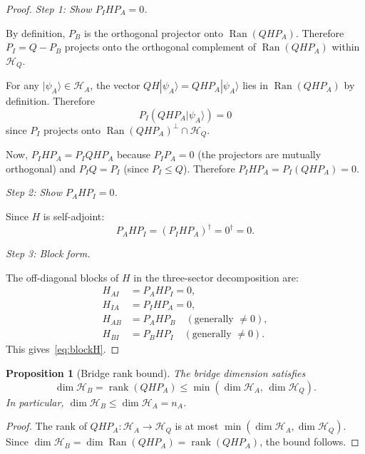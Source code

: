 \documentclass[12pt]{article}
\theoremstyle{plain}
\newtheorem{proposition}[theorem]{Proposition}
\theoremstyle{definition}
\numberwithin{equation}{section}
\DeclareMathOperator{\Ran}{Ran}
\DeclareMathOperator{\rank}{rank}
\begin{document}
\begin{proof}
\emph{Step 1: Show $P_I H P_A = 0$.}

By definition, $P_B$ is the orthogonal projector onto
$\Ran(QHP_A)$.  Therefore $P_I = Q - P_B$ projects onto the
orthogonal complement of $\Ran(QHP_A)$ within $\mathcal{H}_Q$.

For any $|\psi_A\rangle\in\mathcal{H}_A$, the vector
$QH|\psi_A\rangle = QHP_A|\psi_A\rangle$ lies in $\Ran(QHP_A)$
by definition.  Therefore
\begin{equation}
P_I(QHP_A|\psi_A\rangle) = 0
\end{equation}
since $P_I$ projects onto $\Ran(QHP_A)^\perp\cap\mathcal{H}_Q$.

Now, $P_IHP_A = P_IQHP_A$ because $P_IP_A=0$ (the projectors
are mutually orthogonal) and $P_IQ=P_I$ (since $P_I\leq Q$).
Therefore $P_IHP_A = P_I(QHP_A) = 0$.

\emph{Step 2: Show $P_AHP_I = 0$.}

Since $H$ is self-adjoint:
\begin{equation}
P_AHP_I = (P_IHP_A)^\dagger = 0^\dagger = 0.
\end{equation}

\emph{Step 3: Block form.}

The off-diagonal blocks of $H$ in the three-sector decomposition
are:
\begin{align}
H_{AI} &= P_AHP_I = 0,\\
H_{IA} &= P_IHP_A = 0,\\
H_{AB} &= P_AHP_B \quad(\text{generally }\neq 0),\\
H_{BI} &= P_BHP_I \quad(\text{generally }\neq 0).
\end{align}
This gives~\eqref{eq:blockH}.
\end{proof}

\begin{proposition}[Bridge rank bound]\label{prop:rankbound}
The bridge dimension satisfies
\begin{equation}
\dim\mathcal{H}_B = \rank(QHP_A) \leq
\min(\dim\mathcal{H}_A,\,\dim\mathcal{H}_Q).
\end{equation}
In particular, $\dim\mathcal{H}_B\leq\dim\mathcal{H}_A=n_A$.
\end{proposition}

\begin{proof}
The rank of $QHP_A:\mathcal{H}_A\to\mathcal{H}_Q$ is at most
$\min(\dim\mathcal{H}_A,\dim\mathcal{H}_Q)$.  Since
$\dim\mathcal{H}_B=\dim\Ran(QHP_A)=\rank(QHP_A)$, the bound
follows.
\end{proof}
\end{document}
